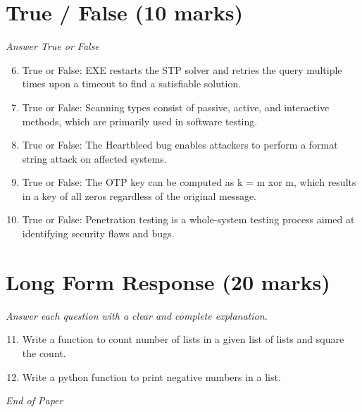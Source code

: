 \documentclass[12pt]{article}
\begin{document}
\section*{True / False (10 marks)}
\textit{Answer True or False}
\begin{enumerate}[label=\arabic*.]
\setcounter{enumi}{5}
\item True or False: EXE restarts the STP solver and retries the query multiple times upon a timeout to find a satisfiable solution.
\item True or False: Scanning types consist of passive, active, and interactive methods, which are primarily used in software testing.
\item True or False: The Heartbleed bug enables attackers to perform a format string attack on affected systems.
\item True or False: The OTP key can be computed as k = m xor m, which results in a key of all zeros regardless of the original message.
\item True or False: Penetration testing is a whole-system testing process aimed at identifying security flaws and bugs.
\end{enumerate}

\section*{Long Form Response (20 marks)}
\textit{Answer each question with a clear and complete explanation.}
\begin{enumerate}[label=\arabic*.]
\setcounter{enumi}{10}
\item Write a function to count number of lists in a given list of lists and square the count.
\item Write a python function to print negative numbers in a list.
\end{enumerate}

\vfill
\noindent\textit{End of Paper}
\end{document}
